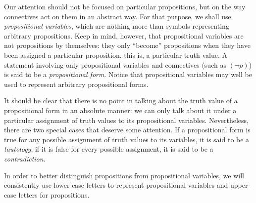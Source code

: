 \begin{para}
Our attention should not be focused on particular propositions, but on the way connectives act on them in an abstract way.
For that purpose, we shall use \emph{propositional variables}, which are nothing more than symbols representing arbitrary propositions.
Keep in mind, however, that propositional variables are not propositions by themselves: they only ``become'' propositions when they have been assigned a particular proposition, this is, a particular truth value.
A statement involving only propositional variables and connectives (such as $(\lnot p)$) is said to be a \emph{propositional form}.
Notice that propositional variables may well be used to represent arbitrary propositional forms.

It should be clear that there is no point in talking about the truth value of a propositional form in an absolute manner: we can only talk about it under a particular assignment of truth values to its propositional variables.
Nevertheless, there are two special cases that deserve some attention.
If a propositional form is true for any possible assignment of truth values to its variables, it is said to be a \emph{tautology}; if it is false for every possible assignment, it is said to be a \emph{contradiction}.

In order to better distinguish propositions from propositional variables, we will consistently use lower-case letters to represent propositional variables and upper-case letters for propositions.
\end{para}

